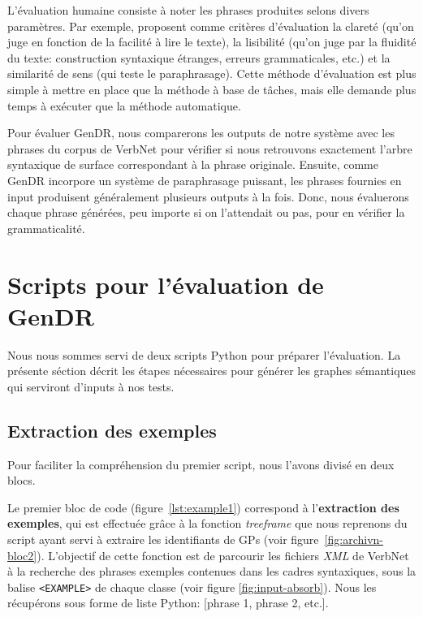 L'évaluation humaine consiste à noter les phrases produites selons divers paramètres. Par exemple, \cite{BelzFirstSurfaceRealisation2011} proposent comme critères d'évaluation la clareté (qu'on juge en fonction de la facilité à lire le texte), la lisibilité (qu'on juge par la fluidité du texte: construction syntaxique étranges, erreurs grammaticales, etc.) et la similarité de sens (qui teste le paraphrasage). Cette méthode d'évaluation est plus simple à mettre en place que la méthode à base de tâches, mais elle demande plus temps à exécuter que la méthode automatique.

Pour évaluer GenDR, nous comparerons les outputs de notre système avec les phrases du corpus de VerbNet pour vérifier si nous retrouvons exactement l'arbre syntaxique de surface correspondant à la phrase originale. Ensuite, comme GenDR incorpore un système de paraphrasage puissant, les phrases fournies en input produisent généralement plusieurs outputs à la fois. Donc, nous évaluerons chaque phrase générées, peu importe si on l'attendait ou pas, pour en vérifier la grammaticalité.

\section{Scripts pour l'évaluation de GenDR}

Nous nous sommes servi de deux scripts Python pour préparer l'évaluation. La présente séction décrit les étapes nécessaires pour générer les graphes sémantiques qui serviront d'inputs à nos tests.

\subsection{Extraction des exemples}

Pour faciliter la compréhension du premier script, nous l'avons divisé en deux blocs. 

Le premier bloc de code (figure~\ref{lst:example1}) correspond à l'\textbf{extraction des exemples}, qui est effectuée grâce à la fonction \emph{treeframe} que nous reprenons du script ayant servi à extraire les identifiants de \acp{GP} (voir figure~\ref{fig:archivn-bloc2}). L'objectif de cette fonction est de parcourir les fichiers \emph{XML} de VerbNet à la recherche des phrases exemples contenues dans les cadres syntaxiques, sous la balise \texttt{<EXAMPLE>} de chaque classe (voir figure \ref{fig:input-absorb}). Nous les récupérons sous forme de liste Python: [phrase 1, phrase 2, etc.].


